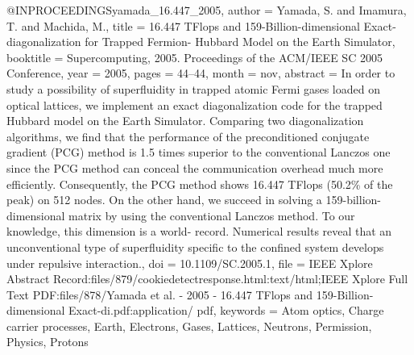 @INPROCEEDINGS{yamada_16.447_2005,
  author = {Yamada, S. and Imamura, T. and Machida, M.},
  title = {16.447 {TFlops} and 159-{Billion}-dimensional {Exact}-diagonalization
	for {Trapped} {Fermion}- {Hubbard} {Model} on the {Earth} {Simulator}},
  booktitle = {Supercomputing, 2005. {Proceedings} of the {ACM}/{IEEE} {SC} 2005
	{Conference}},
  year = {2005},
  pages = {44--44},
  month = nov,
  abstract = {In order to study a possibility of superfluidity in trapped atomic
	Fermi gases loaded on optical lattices, we implement an exact diagonalization
	code for the trapped Hubbard model on the Earth Simulator. Comparing
	two diagonalization algorithms, we find that the performance of the
	preconditioned conjugate gradient (PCG) method is 1.5 times superior
	to the conventional Lanczos one since the PCG method can conceal
	the communication overhead much more efficiently. Consequently, the
	PCG method shows 16.447 TFlops (50.2\% of the peak) on 512 nodes.
	On the other hand, we succeed in solving a 159-billion- dimensional
	matrix by using the conventional Lanczos method. To our knowledge,
	this dimension is a world- record. Numerical results reveal that
	an unconventional type of superfluidity specific to the confined
	system develops under repulsive interaction.},
  doi = {10.1109/SC.2005.1},
  file = {IEEE Xplore Abstract Record:files/879/cookiedetectresponse.html:text/html;IEEE Xplore Full Text  PDF:files/878/Yamada et al. - 2005 - 16.447 TFlops and 159-Billion-dimensional Exact-di.pdf:application/  pdf},
  keywords = {Atom optics, Charge carrier processes, Earth, Electrons, Gases, Lattices,
	Neutrons, Permission, Physics, Protons}
}

